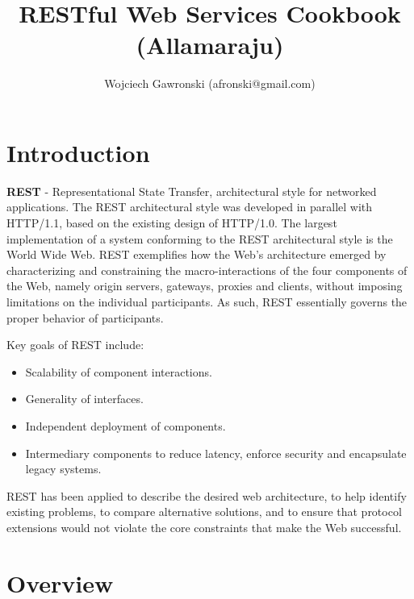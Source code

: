 \documentclass[11pt,a4paper]{article}
\title{RESTful Web Services Cookbook (Allamaraju)}
\author{Wojciech Gawronski (afronski@gmail.com)}
\begin{document}
\maketitle
\newpage

\tableofcontents
\newpage

\section{Introduction}

\textbf{REST} - Representational State Transfer, architectural style for networked applications.
The REST architectural style was developed in parallel with HTTP/1.1, based on the existing design of HTTP/1.0. The largest implementation of a system conforming to the REST architectural style is the World Wide Web. REST exemplifies how the Web's architecture emerged by characterizing and constraining the macro-interactions of the four components of the Web, namely origin servers, gateways, proxies and clients, without imposing limitations on the individual participants. As such, REST essentially governs the proper behavior of participants.

Key goals of REST include:
\begin{itemize}
	\item Scalability of component interactions.
	\item Generality of interfaces.
	\item Independent deployment of components.
	\item Intermediary components to reduce latency, enforce security and encapsulate legacy systems.
\end{itemize}

REST has been applied to describe the desired web architecture, to help identify existing problems, to compare alternative solutions, and to ensure that protocol extensions would not violate the core constraints that make the Web successful.

\section{Overview}
\end{document}

